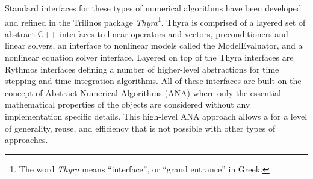 \documentclass[pdf,ps2pdf,11pt]{SANDreport}
\begin{document}

Standard interfaces for these types of numerical algorithms have been developed
and refined in the Trilinos package {}\textit{Thyra}\footnote{The word
{}\textit{Thyra} means ``interface'', or ``grand entrance'' in Greek.}.  Thyra
is comprised of a layered set of abstract C++ interfaces to linear operators
and vectors, preconditioners and linear solvers, an interface to nonlinear
models called the ModelEvaluator, and a nonlinear equation solver interface.
Layered on top of the Thyra interfaces are Rythmos interfaces defining a
number of higher-level abstractions for time stepping and time integration
algorithms.  All of these interfaces are built on the concept of Abstract
Numerical Algorithms (ANA) where only the essential mathematical properties of
the objects are considered without any implementation specific details.  This
high-level ANA approach allows a for a level of generality, reuse, and
efficiency that is not possible with other types of approaches.


\end{document}

